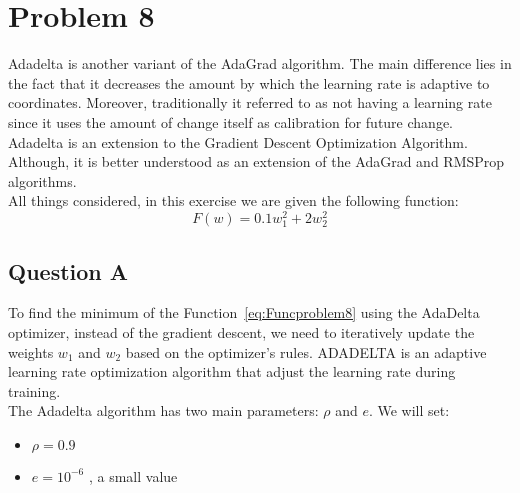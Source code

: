 \section{Problem 8}
Adadelta is another variant of the AdaGrad algorithm. The main difference lies in the fact that it decreases the amount by which the learning rate is adaptive to coordinates. Moreover, traditionally it referred to as not having a learning rate since it uses the amount of change itself as calibration for future change. Adadelta is an extension to the Gradient Descent Optimization Algorithm. Although, it is better understood as an extension of the AdaGrad and RMSProp algorithms. \\

All things considered, in this exercise we are given the following function:
\begin{equation}
	F(w) = 0.1w_1^2 + 2w_2^2
\end{equation}
\label{eq:Funcproblem8}
\vspace{2mm}

\subsection{Question A}
To find the minimum of the Function~\ref{eq:Funcproblem8} using the AdaDelta optimizer, instead of the gradient descent, we need to iteratively update the weights $w_1$ and $w_2$ based on the optimizer's rules. ADADELTA is an adaptive learning rate optimization algorithm that adjust the learning rate during training.\\

The Adadelta algorithm has two main parameters: $\rho$ and $e$. We will set:
\begin{itemize}
	\item $\rho = 0.9$
	\item $e = 10^{-6}$ , a small value 
\end{itemize}

